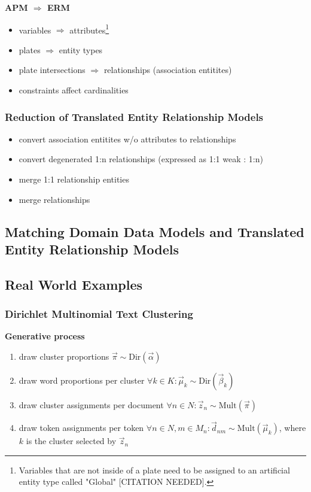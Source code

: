 \textbf{APM $\Rightarrow$ ERM}
\begin{itemize}
\item variables $\Rightarrow$ attributes\footnote{Variables that are not inside of a plate need to be assigned to an artificial entity type called "Global" [CITATION NEEDED].}
\item plates $\Rightarrow$ entity types
\item plate intersections $\Rightarrow$ relationships (association entitites)
\item constraints affect cardinalities
\end{itemize}

\subsubsection{Reduction of Translated Entity Relationship Models}

\textbf{}
\begin{itemize}
\item convert association entitites w/o attributes to relationships
\item convert degenerated 1:n relationships (expressed as 1:1 weak : 1:n)
\item merge 1:1 relationship entities
\item merge relationships
\end{itemize}

\subsection{Matching Domain Data Models and Translated Entity Relationship Models}

\subsection{Real World Examples}

\subsubsection{Dirichlet Multinomial Text Clustering}

\textbf{Generative process}
\begin{enumerate}
\item draw cluster proportions $\vec \pi \sim \text{Dir}(\vec \alpha)$
\item draw word proportions per cluster $\forall k \in K: \vec \mu_k \sim \text{Dir}(\vec \beta_k)$
\item draw cluster assignments per document $\forall n \in N: \vec z_n \sim \text{Mult}(\vec \pi)$
\item draw token assignments per token $\forall n \in N, m \in M_n: \vec d_{nm} \sim \text{Mult}(\vec \mu_k)$, where $k$ is the cluster selected by $\vec z_n$
\end{enumerate}

